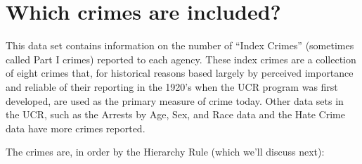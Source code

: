 \documentclass[
  12pt,
  openany]{book}
\begin{document}
\hypertarget{indexCrimesOffensesKnown}{%
\section{Which crimes are included?}\label{indexCrimesOffensesKnown}}

This data set contains information on the number of ``Index Crimes'' (sometimes called Part I crimes) reported to each agency. These index crimes are a collection of eight crimes that, for historical reasons based largely by perceived importance and reliable of their reporting in the 1920's when the UCR program was first developed, are used as the primary measure of crime today. Other data sets in the UCR, such as the Arrests by Age, Sex, and Race data and the Hate Crime data have more crimes reported.

The crimes are, in order by the Hierarchy Rule (which we'll discuss next):
\end{document}
